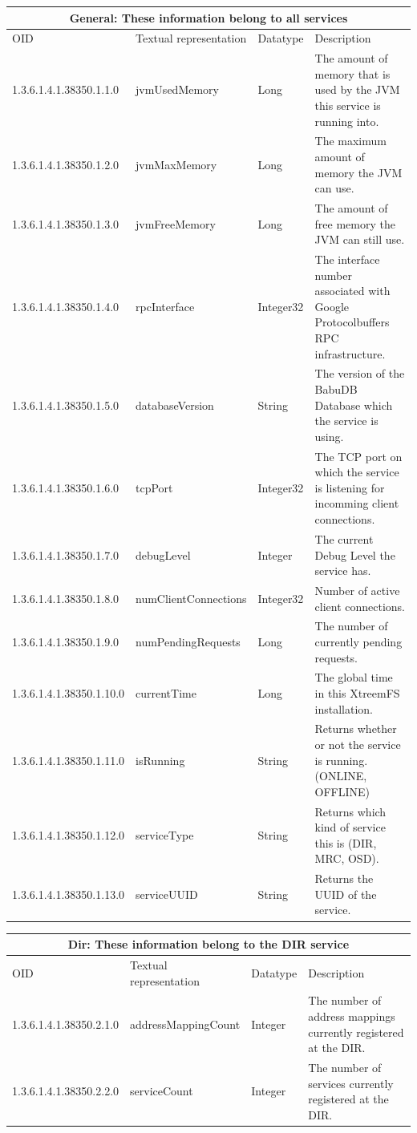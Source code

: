\documentclass[a4paper,10pt]{book}
\begin{document}
\begin{tabular}{|l|l|l|p{5cm}|}
\hline
\multicolumn{4}{|c|}{General: These information belong to all services} \\
\hline
OID & Textual representation & Datatype & Description \\
\hline
1.3.6.1.4.1.38350.1.1.0 & jvmUsedMemory & Long &  The amount of memory that is used by the JVM this service is running into. \\
\hline
1.3.6.1.4.1.38350.1.2.0 & jvmMaxMemory & Long &  The maximum amount of memory the JVM can use. \\
\hline
1.3.6.1.4.1.38350.1.3.0 & jvmFreeMemory & Long &  The amount of free memory the JVM can still use. \\
\hline
1.3.6.1.4.1.38350.1.4.0 & rpcInterface & Integer32 &  The interface number associated with Google Protocolbuffers RPC infrastructure. \\
\hline
1.3.6.1.4.1.38350.1.5.0 & databaseVersion & String & The version of the BabuDB Database which the service is using.   \\
\hline
1.3.6.1.4.1.38350.1.6.0 & tcpPort & Integer32 &  The TCP port on which the service is listening for incomming client connections.  \\
\hline
1.3.6.1.4.1.38350.1.7.0 & debugLevel & Integer &  The current Debug Level the service has.  \\
\hline
1.3.6.1.4.1.38350.1.8.0 & numClientConnections & Integer32 & Number of active client connections. \\
\hline
1.3.6.1.4.1.38350.1.9.0 & numPendingRequests  & Long &  The number of currently pending requests. \\
\hline
1.3.6.1.4.1.38350.1.10.0 & currentTime & Long & The global time in this XtreemFS installation.  \\
\hline
1.3.6.1.4.1.38350.1.11.0 & isRunning & String & Returns whether or not the service is running. (ONLINE, OFFLINE)   \\
\hline
1.3.6.1.4.1.38350.1.12.0 & serviceType & String & Returns which kind of service this is (DIR, MRC, OSD).  \\
\hline
1.3.6.1.4.1.38350.1.13.0 & serviceUUID & String & Returns the UUID of the service. \\
\hline 
\end{tabular}

\begin{tabular}{|l|l|l|p{5cm}|}
\hline
\multicolumn{4}{|c|}{Dir: These information belong to the DIR service} \\
\hline
OID & Textual representation & Datatype & Description \\
\hline
1.3.6.1.4.1.38350.2.1.0 & addressMappingCount & Integer & The  number of address mappings currently registered at the DIR. \\
\hline
1.3.6.1.4.1.38350.2.2.0 & serviceCount & Integer & The number of services currently registered at the DIR. \\
\hline 
\end{tabular}
\end{document}
